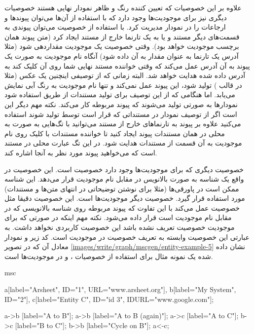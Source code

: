 علاوه بر این خصوصیات که تعیین کننده رنگ و ظاهر نمودار نهایی هستند خصوصیات دیگری
نیز برای موجودیت‌ها وجود دارد که با استفاده از آن‌ها می‌توان پیوندها و ارجاعات
را در نمودار مدیریت کرد. با استفاده از خصوصیت  می‌توان پیوندی به
قسمت‌های دیگر مستند و یا به یک تارنما خارج از مستند ایجاد کرد (متن پیوند همان
برچسب موجودیت خواهد بود). وقتی خصوصیت  یک موجودیت مقداردهی شود (مثلا
آدرس یک تارنما به عنوان مقدار به آن داده شود) آنگاه نام موجودیت به صورت یک پیوند
به آن آدرس عمل می‌کند که وقتی خواننده مستند نهایی شما روی آن کلیک کند به آدرس
داده شده هدایت خواهد شد. البته زمانی که از توصیفی اینچنین یک عکس (مثلا در قالب
) تولید شود، این پیوند عمل نمی‌کند و تنها نام موجودیت به رنگ آبی نمایش
می‌یابد. اما هنگامی که از این توصیف برای تولید مستندات از طریق 
استفاده شود نمودارها به صورتی تولید می‌شوند که پیوند مربوطه کار می‌کند. نکته مهم
دیگر این است اگر از توصیف نمودار در مستنداتی که قرار است توسط  تولید
شوند استفاده می‌کنید علاوه بر پیوند به تارنماهای خارج از مستند می‌توانید با
تگ‌‌هایی به صورت  به محلی در همان مستندات پیوند
ایجاد کنید تا خواننده مستندات با کلیک روی نام موجودیت به آن قسمت از مستندات
هدایت شود. در این تگ عبارت  محلی در مستند است که می‌خواهید پیوند مورد
نظر به آنجا اشاره کند.

خصوصیت دیگری که برای موجودیت‌ها وجود دارد خصوصیت  است. این خصوصیت در واقع
یک شناسه به صورت بالانویس در مقابل نام موجودیت قرار می‌دهد.
این شناسه ممکن است در پاورقی‌ها (مثلا برای نوشتن توضیحاتی در انتهای متن‌ها و
مستندات) مورد استفاده قرار گیرد. خصوصیت دیگر موجودیت‌ها  است. این
خصوصیت دقیقا مثل خصوصیت  عمل می‌کند با این تفاوت که پیوند مربوطه روی
شناسه بالانویسی که در مقابل نام موجودیت است قرار داده می‌شود. نکته مهم اینکه در
صورتی که برای موجودیت خصوصیت  تعریف نشده باشد این خصوصیت کاربردی نخواهد
داشت. به عبارتی این خصوصیت وابسته به تعریف خصوصیت  در موجودیت است. کد زیر
و نمودار معادل آن که در تصویر \ref{images/write/graph/mscgen/entity-example-5}
نشان داده شده یک نمونه مثال برای استفاده از خصوصیات ،  و
 در موجودیت‌ها است.

\begin{MSC}
msc {
	 a[label="Arsheet", ID="1", URL="www.arsheet.org"],
	 b[label="My System", ID="2"],
	 c[label="Entity C", ID="id 3", IDURL="www.google.com"];
	 
	 a->b [label="A to B"];
	 a->b [label="A to B (again)"];
	 a->c [label="A to C"];
  	 b->c [label="B to C"];
  	 b->b [label="Cycle on B"];
  	 a<-c;
}
\end{MSC}

